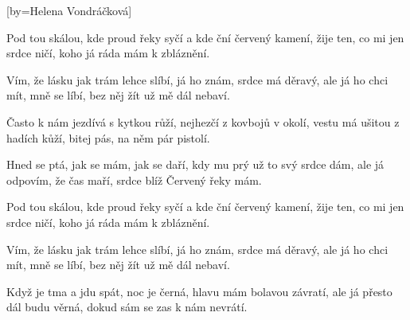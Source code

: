 [by={Helena Vondráčková}]

\beginverse{}
Pod tou skálou, kde proud řeky syčí
a kde ční červený kamení, 
žije ten, co mi jen srdce ničí, 
koho já ráda mám k zbláznění.
\endverse{}

\beginverse{}
Vím, že lásku jak trám lehce slíbí,
já ho znám, srdce má děravý, 
ale já ho chci mít, mně se líbí, 
bez něj žít už mě dál nebaví.
\endverse{}

\beginverse{}
Často k nám jezdívá s kytkou růží,
nejhezčí z kovbojů v okolí, 
vestu má ušitou z hadích kůží, 
bitej pás, na něm pár pistolí.
\endverse{}

\beginverse{}
Hned se ptá, jak se mám, jak se daří,
kdy mu prý už to svý srdce dám, 
ale já odpovím, že čas maří, 
srdce blíž Červený řeky mám.
\endverse{}

\beginverse{}
Pod tou skálou, kde proud řeky syčí
a kde ční červený kamení, 
žije ten, co mi jen srdce ničí, 
koho já ráda mám k zbláznění.
\endverse{}

\beginverse{}
Vím, že lásku jak trám lehce slíbí,
já ho znám, srdce má děravý, 
ale já ho chci mít, mně se líbí, 
bez něj žít už mě dál nebaví.
\endverse{}

\beginverse{}
Když je tma a jdu spát, noc je černá,
hlavu mám bolavou závratí, 
ale já přesto dál budu věrná, 
dokud sám se zas k nám nevrátí.
\endverse{}

\endsong{}
